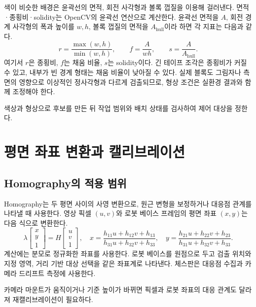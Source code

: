 색이 비슷한 배경은 윤곽선의 면적, 회전 사각형과 볼록 껍질을 이용해 걸러낸다. 면적·종횡비·solidity는 OpenCV의 윤곽선 연산으로 계산한다\cite{opencv-contour}. 윤곽선 면적을 $A$, 회전 경계 사각형의 폭과 높이를 $w,h$, 볼록 껍질의 면적을 $A_{\mathrm{hull}}$이라 하면 각 지표는 다음과 같다.
\begin{equation}
 r=\frac{\max(w,h)}{\min(w,h)},\qquad
 f=\frac{A}{wh},\qquad
 s=\frac{A}{A_{\mathrm{hull}}}.
\end{equation}
여기서 $r$은 종횡비, $f$는 채움 비율, $s$는 solidity이다. 긴 테이프 조각은 종횡비가 커질 수 있고, 내부가 빈 경계 형태는 채움 비율이 낮아질 수 있다. 실제 블록도 그림자나 측면의 영향으로 이상적인 정사각형과 다르게 검출되므로, 형상 조건은 실환경 결과와 함께 조정해야 한다.

색상과 형상으로 후보를 만든 뒤 작업 범위와 배치 상태를 검사하여 제어 대상을 정한다.

\section{평면 좌표 변환과 캘리브레이션}
\subsection{Homography의 적용 범위}
Homography는 두 평면 사이의 사영 변환으로, 원근 변형을 보정하거나 대응점 관계를 나타낼 때 사용한다\cite{opencv-homography}. 영상 픽셀 $(u,v)$와 로봇 베이스 프레임의 평면 좌표 $(x,y)$는 다음 식으로 변환한다.
\begin{equation}
 \lambda\begin{bmatrix}x\\y\\1\end{bmatrix}
 =H\begin{bmatrix}u\\v\\1\end{bmatrix},\quad
 x=\frac{h_{11}u+h_{12}v+h_{13}}{h_{31}u+h_{32}v+h_{33}},\quad
 y=\frac{h_{21}u+h_{22}v+h_{23}}{h_{31}u+h_{32}v+h_{33}}.
\end{equation}
계산에는 분모로 정규화한 좌표를 사용한다. 로봇 베이스를 원점으로 두고 검출 위치와 지정 영역, 거리 기반 대상 선택을 같은 좌표계로 나타낸다. 체스판은 대응점 수집과 카메라 드리프트 측정에 사용한다.

카메라 마운트가 움직이거나 기준 높이가 바뀌면 픽셀과 로봇 좌표의 대응 관계도 달라져 재캘리브레이션이 필요하다.

